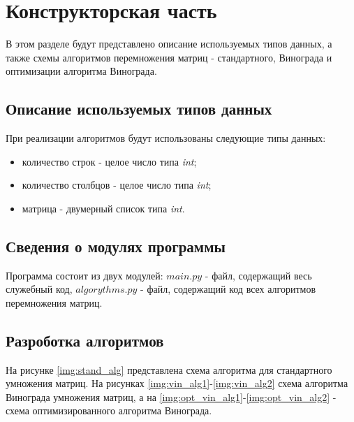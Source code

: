 \chapter{Конструкторская часть}
В этом разделе будут представлено описание используемых типов данных, а также схемы алгоритмов перемножения матриц - стандартного, Винограда и оптимизации алгоритма Винограда.

\section{Описание используемых типов данных}

При реализации алгоритмов будут использованы следующие типы данных:

\begin{itemize}
	\item количество строк - целое число типа \textit{int};
	\item количество столбцов - целое число типа \textit{int};
	\item матрица - двумерный список типа \textit{int}.
\end{itemize}


\section{Сведения о модулях программы}
Программа состоит из двух модулей: $main.py$ - файл, содержащий весь служебный код, $algorythms.py$ - файл, содержащий код всех алгоритмов перемножения матриц. \newline


\section{Разроботка алгоритмов}
На рисунке \ref{img:stand_alg} представлена схема алгоритма для стандартного умножения матриц. На рисунках \ref{img:vin_alg1}-\ref{img:vin_alg2} схема алгоритма Винограда умножения матриц, а на \ref{img:opt_vin_alg1}-\ref{img:opt_vin_alg2} - схема оптимизированного алгоритма Винограда. 


